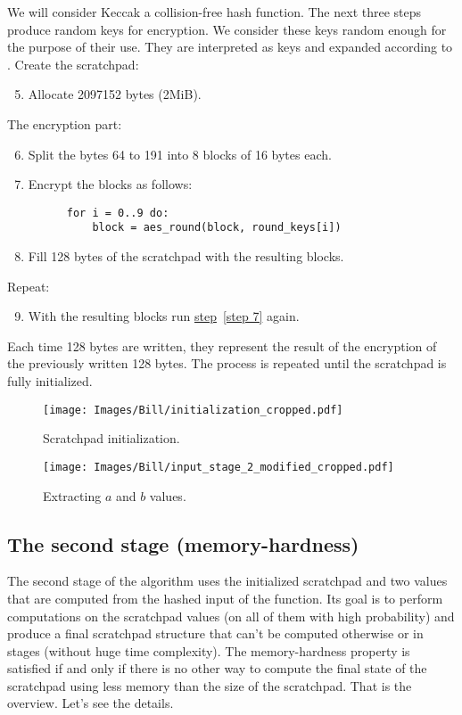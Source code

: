 We will consider Keccak a collision-free hash function. The next three steps produce random keys for encryption. We consider these keys random enough for the purpose of their use. They are interpreted as keys and expanded according to \cite{nla.cat-vn4183631}. Create the scratchpad:
\begin{enumerate}
  \setcounter{enumi}{4}
  \item Allocate 2097152 bytes (2MiB).
\end{enumerate}
The encryption part:
\begin{enumerate}
  \setcounter{enumi}{5}
  \item Split the bytes 64 to 191 into 8 blocks of 16 bytes each.
  \item \label{step 7} Encrypt the blocks as follows:
    \begin{verbatim}
      for i = 0..9 do:
          block = aes_round(block, round_keys[i])
    \end{verbatim}
\end{enumerate}
\begin{enumerate}
  \setcounter{enumi}{7}
  \item Fill 128 bytes of the scratchpad with the resulting blocks.
\end{enumerate}
Repeat:
\begin{enumerate}
  \setcounter{enumi}{8}
  \item With the resulting blocks run \hyperref[step 7]{step}~\ref{step 7} again.
\end{enumerate}

Each time 128 bytes are written, they represent the result of the encryption of the previously written 128 bytes. The process is repeated until the scratchpad is fully initialized.
\clearpage

\begin{figure}
  \centering
  \texttt{[image: Images/Bill/initialization\_cropped.pdf]}
  \caption{Scratchpad initialization.~\cite{bill}}
  \label{fig:initialization}
\end{figure}
\clearpage

\begin{figure}[H]
  \centering
  \texttt{[image: Images/Bill/input\_stage\_2\_modified\_cropped.pdf]}
  \caption{Extracting $a$ and $b$ values.~\cite{bill}}
  \label{fig:stage2input}
\end{figure}

\subsection{The second stage (memory-hardness)} \label{sec:second}
The second stage of the algorithm uses the initialized scratchpad and two values that are computed from the hashed input of the function. Its goal is to perform computations on the scratchpad values (on all of them with high probability) and produce a final scratchpad structure that can't be computed otherwise or in stages (without huge time complexity). The memory-hardness property is satisfied if and only if there is no other way to compute the final state of the scratchpad using less memory than the size of the scratchpad. That is the overview. Let's see the details.

